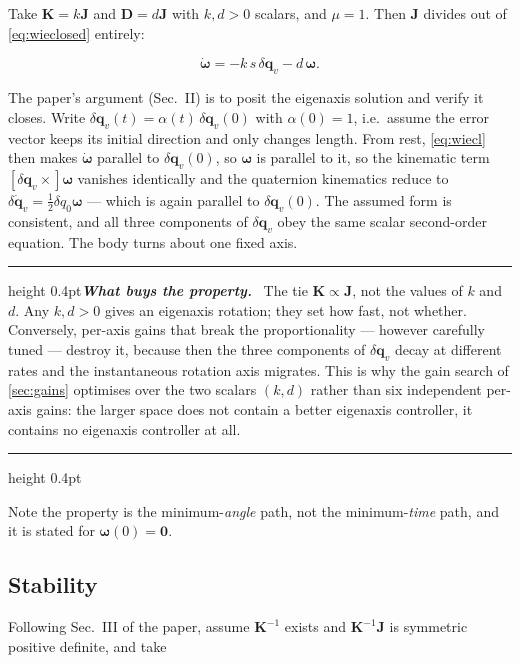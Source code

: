 \documentclass[conference,10pt,a4paper]{IEEEtran}
\newcommand{\remarkrule}{\par\nobreak\vspace{2pt}%
  \hrule height 0.4pt\vspace{4pt}\nobreak}
\newenvironment{keybox}[1][Result]
  {\par\medskip\remarkrule\noindent\small\textbf{\textit{#1.}}\ \ignorespaces}
  {\par\vspace{3pt}\hrule height 0.4pt\par\medskip\ignorespacesafterend}
\newcommand{\vect}[1]{\bm{#1}}
\newcommand{\mat}[1]{\bm{#1}}
\newcommand{\skewm}[1]{\left[#1\times\right]}
\begin{document}
Take $\mat{K}=k\mat{J}$ and $\mat{D}=d\mat{J}$ with $k,d>0$ scalars, and
$\mu=1$. Then $\mat{J}$ divides out of \cref{eq:wieclosed} entirely:

\begin{equation}
\dot{\vect{\omega}} = -k\,s\,\delta\vect{q}_v - d\,\vect{\omega}.
\label{eq:wiecl}
\end{equation}

The paper's argument (Sec.~II) is to posit the eigenaxis solution and verify it
closes. Write $\delta\vect{q}_v(t)=\alpha(t)\,\delta\vect{q}_v(0)$ with
$\alpha(0)=1$, i.e.\ assume the error vector keeps its initial direction and
only changes length. From rest, \cref{eq:wiecl} then makes
$\dot{\vect{\omega}}$ parallel to $\delta\vect{q}_v(0)$, so $\vect{\omega}$ is
parallel to it, so the kinematic term
$\skewm{\delta\vect{q}_v}\vect{\omega}$ vanishes identically and the
quaternion kinematics reduce to $\delta\dot{\vect{q}}_v =
\tfrac{1}{2}\delta q_0\vect{\omega}$ --- which is again parallel to
$\delta\vect{q}_v(0)$. The assumed form is consistent, and all three components
of $\delta\vect{q}_v$ obey the same scalar second-order equation. The body
turns about one fixed axis.

\begin{keybox}[What buys the property]
The tie $\mat{K}\propto\mat{J}$, not the values of $k$ and $d$. Any $k,d>0$
gives an eigenaxis rotation; they set how fast, not whether. Conversely,
per-axis gains that break the proportionality --- however carefully tuned ---
destroy it, because then the three components of $\delta\vect{q}_v$ decay at
different rates and the instantaneous rotation axis migrates. This is why the
gain search of \cref{sec:gains} optimises over the two scalars $(k,d)$ rather
than six independent per-axis gains: the larger space does not contain a better
eigenaxis controller, it contains no eigenaxis controller at all.
\end{keybox}

Note the property is the minimum-\emph{angle} path, not the
minimum-\emph{time} path, and it is stated for $\vect{\omega}(0)=\vect{0}$.

\subsection{Stability}
\label{sec:wiestab}

Following Sec.~III of the paper, assume $\mat{K}^{-1}$ exists and
$\mat{K}^{-1}\mat{J}$ is symmetric positive definite, and take
\end{document}
